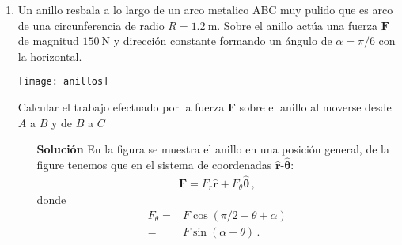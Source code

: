 \begin{enumerate}
\item Un anillo resbala a lo largo de un arco metalico ABC muy pulido
  que es arco de una circunferencia de radio
  $R=\SI{1.2}{\meter}$. 
  Sobre el anillo actúa una fuerza $\mathbf{F}$ de magnitud
  $\SI{150}{\newton}$ y dirección constante formando un ángulo de
  $\alpha=\pi/6$ con la horizontal.

  \begin{minipage}{0.5\linewidth}
   \texttt{[image: anillos]}
  \end{minipage}
  \begin{minipage}{0.5\linewidth}
    Calcular el trabajo efectuado por la fuerza $\mathbf{F}$ sobre el anillo al moverse desde $A$ a $B$ y de $B$ a $C$
  \end{minipage}
  \begin{itemize}
  \item[\textbf{Solución}]
    En la figura se muestra el anillo en una posición general, de la figure tenemos que en el sistema de coordenadas $\hat{\mathbf{r}}$-$\hat{\boldsymbol{\theta}}$:
    \begin{align*}
      \mathbf{F}=F_r \hat{\mathbf{r}}+F_\theta\hat{\boldsymbol{\theta}}\,,
    \end{align*}
    donde
    \begin{align*}
      F_\theta=&F\cos(\pi/2-\theta+\alpha)\nonumber\\
      =&F\sin(\alpha-\theta)\,. %
    \end{align*}


\end{itemize}
\end{enumerate}
